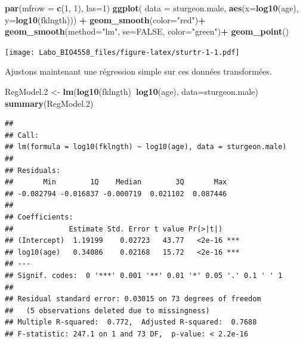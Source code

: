 \documentclass[12pt,]{book}
\newenvironment{Shaded}{\begin{snugshade}}{\end{snugshade}}
\newcommand{\DataTypeTok}[1]{\textcolor[rgb]{0.13,0.29,0.53}{#1}}
\newcommand{\DecValTok}[1]{\textcolor[rgb]{0.00,0.00,0.81}{#1}}
\newcommand{\FloatTok}[1]{\textcolor[rgb]{0.00,0.00,0.81}{#1}}
\newcommand{\KeywordTok}[1]{\textcolor[rgb]{0.13,0.29,0.53}{\textbf{#1}}}
\newcommand{\NormalTok}[1]{#1}
\newcommand{\OperatorTok}[1]{\textcolor[rgb]{0.81,0.36,0.00}{\textbf{#1}}}
\newcommand{\OtherTok}[1]{\textcolor[rgb]{0.56,0.35,0.01}{#1}}
\newcommand{\StringTok}[1]{\textcolor[rgb]{0.31,0.60,0.02}{#1}}
\begin{document}
\begin{Shaded}
\begin{Highlighting}[]
\KeywordTok{par}\NormalTok{(}\DataTypeTok{mfrow =} \KeywordTok{c}\NormalTok{(}\DecValTok{1}\NormalTok{, }\DecValTok{1}\NormalTok{), }\DataTypeTok{las=}\DecValTok{1}\NormalTok{)}
\KeywordTok{ggplot}\NormalTok{(}
  \DataTypeTok{data =}\NormalTok{ sturgeon.male,}
  \KeywordTok{aes}\NormalTok{(}\DataTypeTok{x=}\KeywordTok{log10}\NormalTok{(age), }\DataTypeTok{y=}\KeywordTok{log10}\NormalTok{(fklngth))) }\OperatorTok{+}
\StringTok{  }\KeywordTok{geom_smooth}\NormalTok{(}\DataTypeTok{color=}\StringTok{"red"}\NormalTok{)}\OperatorTok{+}
\StringTok{  }\KeywordTok{geom_smooth}\NormalTok{(}\DataTypeTok{method=}\StringTok{"lm"}\NormalTok{, }\DataTypeTok{se=}\OtherTok{FALSE}\NormalTok{, }\DataTypeTok{color=}\StringTok{"green"}\NormalTok{)}\OperatorTok{+}
\StringTok{  }\KeywordTok{geom_point}\NormalTok{()}
\end{Highlighting}
\end{Shaded}

\texttt{[image: Labo\_BIO4558\_files/figure-latex/sturtr-1-1.pdf]}

Ajustons maintenant une régression simple sur ces données transformées.

\begin{Shaded}
\begin{Highlighting}[]
\NormalTok{RegModel}\FloatTok{.2}\NormalTok{ <-}\StringTok{ }\KeywordTok{lm}\NormalTok{(}\KeywordTok{log10}\NormalTok{(fklngth)}\OperatorTok{~}\KeywordTok{log10}\NormalTok{(age), }\DataTypeTok{data=}\NormalTok{sturgeon.male)}
\KeywordTok{summary}\NormalTok{(RegModel}\FloatTok{.2}\NormalTok{)}
\end{Highlighting}
\end{Shaded}

\begin{verbatim}
## 
## Call:
## lm(formula = log10(fklngth) ~ log10(age), data = sturgeon.male)
## 
## Residuals:
##       Min        1Q    Median        3Q       Max 
## -0.082794 -0.016837 -0.000719  0.021102  0.087446 
## 
## Coefficients:
##             Estimate Std. Error t value Pr(>|t|)    
## (Intercept)  1.19199    0.02723   43.77   <2e-16 ***
## log10(age)   0.34086    0.02168   15.72   <2e-16 ***
## ---
## Signif. codes:  0 '***' 0.001 '**' 0.01 '*' 0.05 '.' 0.1 ' ' 1
## 
## Residual standard error: 0.03015 on 73 degrees of freedom
##   (5 observations deleted due to missingness)
## Multiple R-squared:  0.772,  Adjusted R-squared:  0.7688 
## F-statistic: 247.1 on 1 and 73 DF,  p-value: < 2.2e-16
\end{verbatim}
\end{document}
